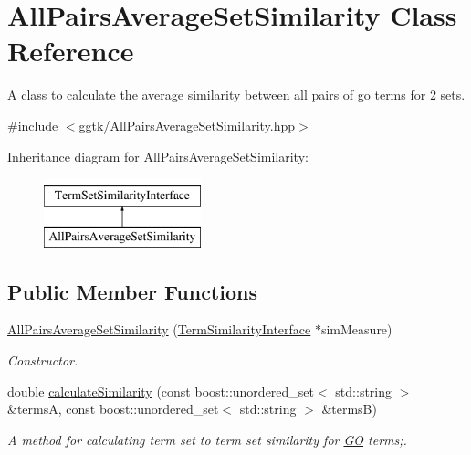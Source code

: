 \hypertarget{classAllPairsAverageSetSimilarity}{}\section{All\+Pairs\+Average\+Set\+Similarity Class Reference}
\label{classAllPairsAverageSetSimilarity}


A class to calculate the average similarity between all pairs of go terms for 2 sets.  




{\ttfamily \#include $<$ggtk/\+All\+Pairs\+Average\+Set\+Similarity.\+hpp$>$}

Inheritance diagram for All\+Pairs\+Average\+Set\+Similarity\+:\begin{figure}[H]
\begin{center}
\leavevmode
\includegraphics[height=2.000000cm]{classAllPairsAverageSetSimilarity}
\end{center}
\end{figure}
\subsection*{Public Member Functions}
\begin{DoxyCompactItemize}
\item 
\hyperlink{classAllPairsAverageSetSimilarity_a67b7cfe7f078bea616baaf99116ace2e}{All\+Pairs\+Average\+Set\+Similarity} (\hyperlink{classTermSimilarityInterface}{Term\+Similarity\+Interface} $\ast$sim\+Measure)
\begin{DoxyCompactList}\small\item\em Constructor. \end{DoxyCompactList}\item 
double \hyperlink{classAllPairsAverageSetSimilarity_a685cd98d44c2e2ab9ee4fe7071066cde}{calculate\+Similarity} (const boost\+::unordered\+\_\+set$<$ std\+::string $>$ \&termsA, const boost\+::unordered\+\_\+set$<$ std\+::string $>$ \&termsB)
\begin{DoxyCompactList}\small\item\em A method for calculating term set to term set similarity for \hyperlink{namespaceGO}{GO} terms;. \end{DoxyCompactList}\end{DoxyCompactItemize}


